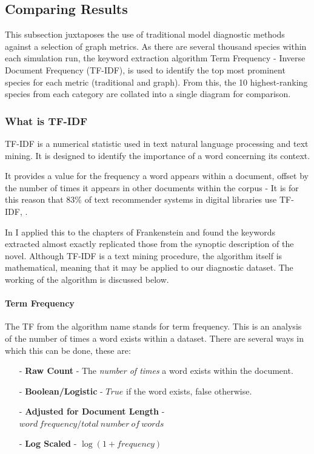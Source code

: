 \subsection{Comparing Results}
This subsection juxtaposes the use of traditional model diagnostic methods against a selection of graph metrics. As there are several thousand species within each simulation run, the keyword extraction algorithm Term Frequency - Inverse Document Frequency (TF-IDF), is used to identify the top most prominent species for each metric (traditional and graph). From this, the 10 highest-ranking species from each category are collated into a single diagram for comparison. 


\subsubsection{What is TF-IDF}
TF-IDF is a numerical statistic used in text natural language processing and text mining. It is designed to identify the importance of a word concerning its context. 

It provides a value for the frequency a word appears within a document, offset by the number of times it appears in other documents within the corpus - It is for this reason that 83\% of text recommender systems in digital libraries use TF-IDF, \citep{tf83}. 

 In \citep{frankenstein} I applied this to the chapters of Frankenstein and found the keywords extracted almost exactly replicated those from the synoptic description of the novel. Although TF-IDF is a text mining procedure, the algorithm itself is mathematical, meaning that it may be applied to our diagnostic dataset. The working of the algorithm is discussed below.

\paragraph*{Term Frequency}
The TF from the algorithm name stands for term frequency. This is an analysis of the number of times a word exists within a dataset. There are several ways in which this can be done, these are:

\begin{itemize}
    \item[-] \textbf{Raw Count} - The \textit{number of times} a word exists within the document.
    \item[-] \textbf{Boolean/Logistic} - $True$ if the word exists, false otherwise.
    \item[-] \textbf{Adjusted for Document Length} -  $word\ frequency / total\ number\ of\ words$
    \item[-] \textbf{Log Scaled} - $\log(1+frequency)$
\end{itemize}


